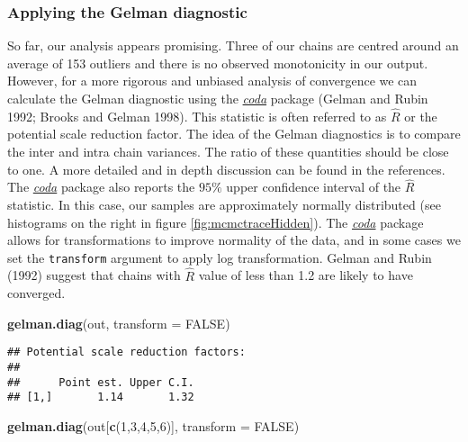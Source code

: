 \documentclass[]{article}
\newenvironment{Shaded}{\begin{snugshade}}{\end{snugshade}}
\newcommand{\KeywordTok}[1]{\textcolor[rgb]{0.13,0.29,0.53}{\textbf{{#1}}}}
\newcommand{\DataTypeTok}[1]{\textcolor[rgb]{0.13,0.29,0.53}{{#1}}}
\newcommand{\DecValTok}[1]{\textcolor[rgb]{0.00,0.00,0.81}{{#1}}}
\newcommand{\OtherTok}[1]{\textcolor[rgb]{0.56,0.35,0.01}{{#1}}}
\newcommand{\NormalTok}[1]{{#1}}
\begin{document}
\subsubsection{Applying the Gelman
diagnostic}\label{applying-the-gelman-diagnostic}

So far, our analysis appears promising. Three of our chains are centred
around an average of 153 outliers and there is no observed monotonicity
in our output. However, for a more rigorous and unbiased analysis of
convergence we can calculate the Gelman diagnostic using the
\emph{\href{https://CRAN.R-project.org/package=coda}{coda}} package
(Gelman and Rubin 1992; Brooks and Gelman 1998). This statistic is often
referred to as \(\hat{R}\) or the potential scale reduction factor. The
idea of the Gelman diagnostics is to compare the inter and intra chain
variances. The ratio of these quantities should be close to one. A more
detailed and in depth discussion can be found in the references. The
\emph{\href{https://CRAN.R-project.org/package=coda}{coda}} package also
reports the \(95\%\) upper confidence interval of the \(\hat{R}\)
statistic. In this case, our samples are approximately normally
distributed (see histograms on the right in figure
\ref{fig:mcmctraceHidden}). The
\emph{\href{https://CRAN.R-project.org/package=coda}{coda}} package
allows for transformations to improve normality of the data, and in some
cases we set the \texttt{transform} argument to apply log
transformation. Gelman and Rubin (1992) suggest that chains with
\(\hat{R}\) value of less than 1.2 are likely to have converged.

\begin{Shaded}
\begin{Highlighting}[]
\KeywordTok{gelman.diag}\NormalTok{(out, }\DataTypeTok{transform =} \OtherTok{FALSE}\NormalTok{)}
\end{Highlighting}
\end{Shaded}

\begin{verbatim}
## Potential scale reduction factors:
## 
##      Point est. Upper C.I.
## [1,]       1.14       1.32
\end{verbatim}

\begin{Shaded}
\begin{Highlighting}[]
\KeywordTok{gelman.diag}\NormalTok{(out[}\KeywordTok{c}\NormalTok{(}\DecValTok{1}\NormalTok{,}\DecValTok{3}\NormalTok{,}\DecValTok{4}\NormalTok{,}\DecValTok{5}\NormalTok{,}\DecValTok{6}\NormalTok{)], }\DataTypeTok{transform =} \OtherTok{FALSE}\NormalTok{)}
\end{Highlighting}
\end{Shaded}
\end{document}

